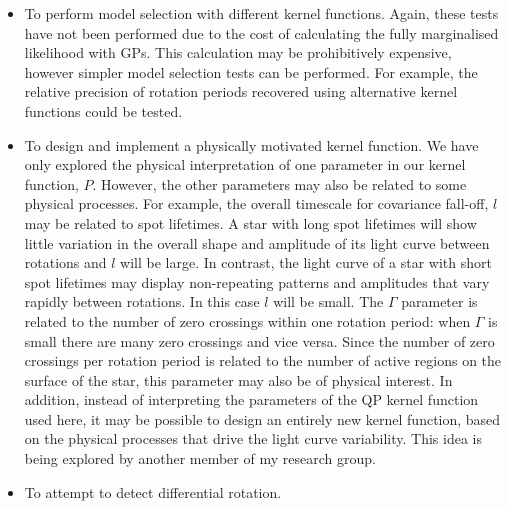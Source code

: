 \documentclass[useAMS, usenatbib, preprint, 12pt]{aastex}
\newcommand{\ie}{{\it i.e.}}
\begin{document}
\begin{itemize}
\item{To perform model selection with different kernel functions. Again, these
tests have not been performed due to the cost of calculating the fully
marginalised likelihood with GPs. This calculation may be prohibitively
expensive, however simpler model selection tests can be performed. For
example, the relative precision of rotation periods recovered using
alternative kernel functions could be tested.}
\item{To design and implement a physically motivated kernel function. We have
only explored the physical interpretation of one parameter in our kernel
function, $P$.
However, the other parameters may also be related to some physical processes.
For example, the overall timescale for covariance fall-off, $l$ may be
related to spot lifetimes.
A star with long spot lifetimes will show little variation in the overall
shape and amplitude of its light curve between rotations and $l$ will be
large.
In contrast, the light curve of a star with short spot lifetimes may display
non-repeating patterns and amplitudes that vary rapidly between rotations.
In this case $l$ will be small.
The $\Gamma$ parameter is related to the number of zero crossings within one
rotation period: when $\Gamma$ is small there are many zero crossings and
vice versa.
Since the number of zero crossings per rotation period is related to the
number of active regions on the surface of the star, this parameter may also
be of physical interest.
In addition, instead of interpreting the parameters of the QP kernel function
used here, it may be possible to design an entirely new kernel function, based
on the physical processes that drive the light curve variability.
This idea is being explored by another member of my research group.}
\item{To attempt to detect differential rotation.
}
\end{itemize}
\end{document}
